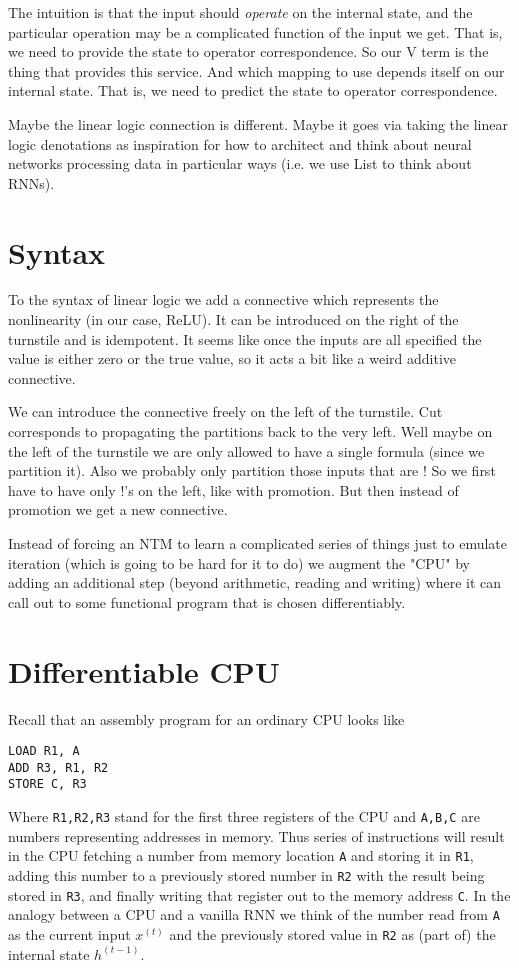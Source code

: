 \documentclass[english,letter paper,12pt,leqno]{article}
\theoremstyle{example}
\numberwithin{equation}{section}
\begin{document}
The intuition is that the input should \emph{operate} on the internal state, and the particular operation may be a complicated function of the input we get. That is, we need to provide the state to operator correspondence. So our V term is the thing that provides this service. And which mapping to use depends itself on our internal state. That is, we need to predict the state to operator correspondence. 

Maybe the linear logic connection is different. Maybe it goes via taking the linear logic denotations as inspiration for how to architect and think about neural networks processing data in particular ways (i.e. we use List to think about RNNs).

\section{Syntax}

To the syntax of linear logic we add a connective which represents the nonlinearity (in our case, ReLU). It can be introduced on the right of the turnstile and is idempotent. It seems like once the inputs are all specified the value is either zero or the true value, so it acts a bit like a weird additive connective. 

We can introduce the connective freely on the left of the turnstile. Cut corresponds to propagating the partitions back to the very left. Well maybe on the left of the turnstile we are only allowed to have a single formula (since we partition it). Also we probably only partition those inputs that are ! So we first have to have only !’s on the left, like with promotion. But then instead of promotion we get a new connective.

Instead of forcing an NTM to learn a complicated series of things just to emulate iteration (which is going to be hard for it to do) we augment the "CPU" by adding an additional step (beyond arithmetic, reading and writing) where it can call out to some functional program that is chosen differentiably.

\section{Differentiable CPU}\label{section:appendix_cpu}

Recall that an assembly program for an ordinary CPU looks like
\begin{verbatim}
LOAD R1, A
ADD R3, R1, R2
STORE C, R3
\end{verbatim}
Where \verb+R1,R2,R3+ stand for the first three registers of the CPU and \verb+A,B,C+ are numbers representing addresses in memory. Thus series of instructions will result in the CPU fetching a number from memory location \verb+A+ and storing it in \verb+R1+, adding this number to a previously stored number in \verb+R2+ with the result being stored in \verb+R3+, and finally writing that register out to the memory address \verb+C+. In the analogy between a CPU and a vanilla RNN we think of the number read from \verb+A+ as the current input $x^{(t)}$ and the previously stored value in \verb+R2+ as (part of) the internal state $h^{(t-1)}$.
\end{document}

